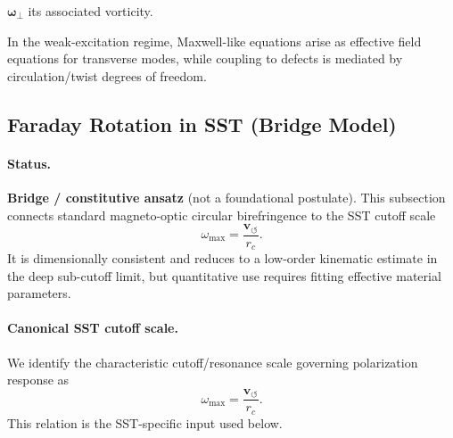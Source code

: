 \documentclass[10pt]{article}
\newcommand{\swirlarrow}{ \mathchoice{\mkern-2mu\scriptstyle\boldsymbol{\circlearrowleft}}{\mkern-2mu\scriptscriptstyle\boldsymbol{\circlearrowleft}}}
\newcommand{\vswirl}{\mathbf{v}_{\!\boldsymbol{\circlearrowleft}}}
\begin{document}
    $\boldsymbol{\omega}_\perp$ its associated vorticity.

    In the weak-excitation regime, Maxwell-like equations arise as effective field
    equations for transverse modes, while coupling to defects is mediated by
    circulation/twist degrees of freedom.


        \providecommand{\swirlarrow}{\mathchoice{\mkern-2mu\scriptstyle\boldsymbol{\circlearrowleft}}{\mkern-2mu\scriptstyle\boldsymbol{\circlearrowleft}}{\mkern-2mu\scriptscriptstyle\boldsymbol{\circlearrowleft}}{\mkern-2mu\scriptscriptstyle\boldsymbol{\circlearrowleft}}}
        \providecommand{\vswirl}{\mathbf{v}_{\swirlarrow}}
        \providecommand{\rc}{r_c}
        \providecommand{\rhoF}{\rho_{\!f}}
        \providecommand{\rhoE}{\rho_{\!E}}
        \providecommand{\rhoM}{\rho_{\!m}}

    \subsection{Faraday Rotation in SST (Bridge Model)}
        \label{subsec:sst-faraday-bridge}

        \paragraph{Status.}
            \textbf{Bridge / constitutive ansatz} (not a foundational postulate). This subsection connects standard magneto-optic circular birefringence to the SST cutoff scale
            \[
                \omega_{\max}=\frac{\vswirl}{\rc}.
            \]
            It is dimensionally consistent and reduces to a low-order kinematic estimate in the deep sub-cutoff limit, but quantitative use requires fitting effective material parameters.

        \paragraph{Canonical SST cutoff scale.}
            We identify the characteristic cutoff/resonance scale governing polarization response as
            \begin{equation}
                \omega_{\max}=\frac{\vswirl}{\rc}.
                \label{eq:sst-faraday-omega-max}
            \end{equation}
            This relation is the SST-specific input used below.
\end{document}
